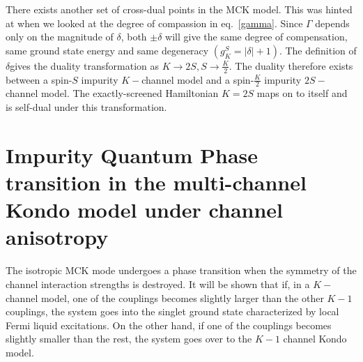 \documentclass[reprint,prb,superscriptaddress]{revtex4-2}
\begin{document}
There exists another set of cross-dual points in the MCK model. This was hinted at when we looked at the degree of compassion in eq.~\ref{gamma}. Since \(\Gamma\) depends only on the magnitude of \(\delta\), both \(\pm \delta\) will give the same degree of compensation, same ground state energy and same degeneracy \(\left(g^S_K = |\delta|+1\right)\). The definition of \(\delta\)gives the duality transformation as \(K \to 2S, S \to \frac{K}{2}\). The duality therefore exists between a spin-\(S\) impurity \(K-\)channel model and a spin-\(\frac{K}{2}\) impurity \(2S-\)channel model. The exactly-screened Hamiltonian \(K=2S\) maps on to itself and is self-dual under this transformation.



\section{Impurity Quantum Phase transition in the multi-channel Kondo model under channel anisotropy}
The isotropic MCK mode undergoes a phase transition when the symmetry of the channel interaction strengths is destroyed. It will be shown that if, in a \(K-\)channel model, one of the couplings becomes slightly larger than the other \(K-1\) couplings, the system goes into the singlet ground state characterized by local Fermi liquid excitations. On the other hand, if one of the couplings becomes slightly smaller than the rest, the system goes over to the \(K-1\) channel Kondo model.
\end{document}
